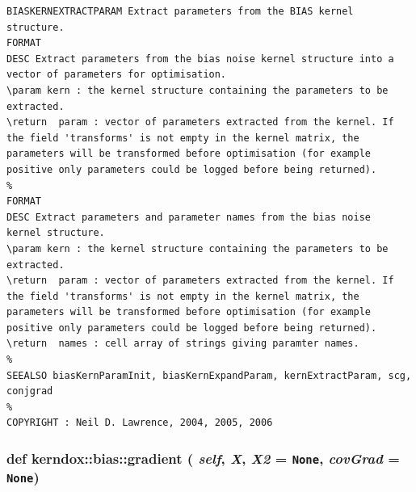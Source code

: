 \footnotesize\begin{verbatim}BIASKERNEXTRACTPARAM Extract parameters from the BIAS kernel structure.
FORMAT
DESC Extract parameters from the bias noise kernel structure into a
vector of parameters for optimisation.
\param kern : the kernel structure containing the parameters to be
extracted.
\return  param : vector of parameters extracted from the kernel. If
the field 'transforms' is not empty in the kernel matrix, the
parameters will be transformed before optimisation (for example
positive only parameters could be logged before being returned).
%
FORMAT
DESC Extract parameters and parameter names from the bias noise
kernel structure.
\param kern : the kernel structure containing the parameters to be
extracted.
\return  param : vector of parameters extracted from the kernel. If
the field 'transforms' is not empty in the kernel matrix, the
parameters will be transformed before optimisation (for example
positive only parameters could be logged before being returned).
\return  names : cell array of strings giving paramter names.
%
SEEALSO biasKernParamInit, biasKernExpandParam, kernExtractParam, scg, conjgrad
%
COPYRIGHT : Neil D. Lawrence, 2004, 2005, 2006

\end{verbatim}
\normalsize
 \hypertarget{classkerndox_1_1bias_f7f4db511633014f8acf332a7ef0fa78}{
\subsubsection[{gradient}]{\setlength{\rightskip}{0pt plus 5cm}def kerndox::bias::gradient ( {\em self}, \/   {\em X}, \/   {\em X2} = {\tt None}, \/   {\em covGrad} = {\tt None})}}
\label{classkerndox_1_1bias_f7f4db511633014f8acf332a7ef0fa78}





